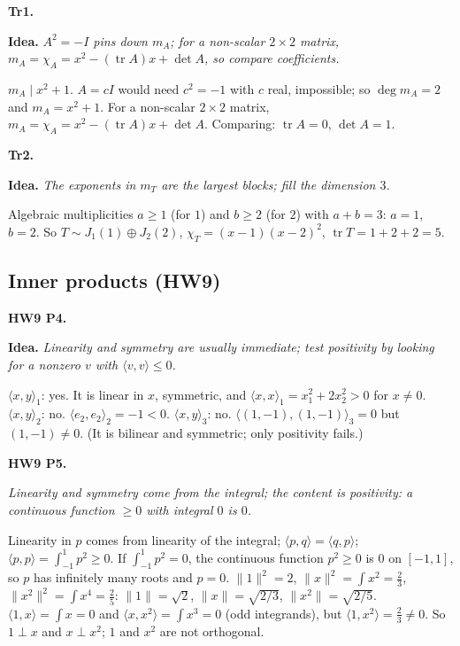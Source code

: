 \documentclass[10pt]{scrartcl}
\DeclareMathOperator{\tr}{tr}
\newcommand{\ip}[2]{\langle #1,#2\rangle}
\newcommand{\idea}[1]{{\color{OliveGreen!75!black}\textbf{Idea.}} \textit{#1}\par}
\newenvironment{prob}{\par\medskip\noindent\begin{minipage}{\linewidth}\setlength{\parskip}{3pt}}{\end{minipage}\par}
\begin{document}
\begin{prob}
\textbf{Tr1. }\par 
\idea{$A^2=-I$ pins down $m_A$; for a non-scalar $2\times2$ matrix, $m_A=\chi_A=x^2-(\tr A)x+\det A$, so compare coefficients.}
$m_A\mid x^2+1$. $A=cI$ would need $c^2=-1$ with $c$ real, impossible; so $\deg m_A=2$ and $m_A=x^2+1$. For a non-scalar $2\times2$ matrix, $m_A=\chi_A=x^2-(\tr A)x+\det A$. Comparing: $\tr A=0$, $\det A=1$.
\end{prob}

\begin{prob}
\textbf{Tr2. }\par 
\idea{The exponents in $m_T$ are the largest blocks; fill the dimension $3$.}
Algebraic multiplicities $a\ge1$ (for $1$) and $b\ge2$ (for $2$) with $a+b=3$: $a=1$, $b=2$. So $T\sim J_1(1)\oplus J_2(2)$, $\chi_T=(x-1)(x-2)^2$, $\tr T=1+2+2=5$.
\end{prob}

\subsection{Inner products (HW9)}

\begin{prob}
\textbf{HW9 P4. }\par 
\idea{Linearity and symmetry are usually immediate; test positivity by looking for a nonzero $v$ with $\ip vv\le0$.}$\ip xy_1$: yes. It is linear in $x$, symmetric, and $\ip xx_1=x_1^2+2x_2^2>0$ for $x\ne0$.
$\ip xy_2$: no. $\ip{e_2}{e_2}_2=-1<0$.
$\ip xy_3$: no. $\ip{(1,-1)}{(1,-1)}_3=0$ but $(1,-1)\ne0$. (It is bilinear and symmetric; only positivity fails.)
\end{prob}

\begin{prob}
\textbf{HW9 P5. }\par 
\begin{enumerate}[(a)]
  \ii \idea{Linearity and symmetry come from the integral; the content is positivity: a continuous function $\ge0$ with integral $0$ is $0$.}Linearity in $p$ comes from linearity of the integral; $\ip pq=\ip qp$; $\ip pp=\int_{-1}^1p^2\ge0$. If $\int_{-1}^1p^2=0$, the continuous function $p^2\ge0$ is $0$ on $[-1,1]$, so $p$ has infinitely many roots and $p=0$.
  \ii $\|1\|^2=2$, $\|x\|^2=\int x^2=\frac23$, $\|x^2\|^2=\int x^4=\frac25$: $\|1\|=\sqrt2$, $\|x\|=\sqrt{2/3}$, $\|x^2\|=\sqrt{2/5}$.
  \ii $\ip1x=\int x=0$ and $\ip x{x^2}=\int x^3=0$ (odd integrands), but $\ip1{x^2}=\frac23\ne0$. So $1\perp x$ and $x\perp x^2$; $1$ and $x^2$ are not orthogonal.
\end{enumerate}
\end{prob}
\end{document}
